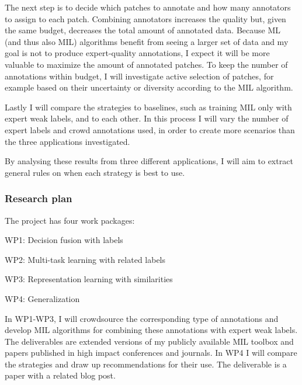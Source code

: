 \documentclass[serif, twocolumn, numeric, rga]{jote-article}
\begin{document}
The next step is to decide which patches to annotate and how many annotators to assign to each patch. Combining annotators increases the quality but, given the same budget, decreases the total amount of annotated data. Because ML (and thus also MIL) algorithms benefit from seeing a larger set of data and my goal is not to produce expert-quality annotations, I expect it will be more valuable to maximize the amount of annotated patches. To keep the number of annotations within budget, I will investigate active selection of patches, for example based on their uncertainty or diversity according to the MIL algorithm.




Lastly I will compare the strategies to baselines, such as training MIL only with expert weak labels, and to each other. In this process I will vary the number of expert labels and crowd annotations used, in order to create more scenarios than the three applications investigated.

By analysing these results from three different applications, I will aim to extract general rules on when each strategy is best to use.

\subsubsection*{Research plan}

The project has four work packages: 
\begin{description}
\item WP1: Decision fusion with labels 
\item WP2: Multi-task learning with related labels 
\item WP3: Representation learning with similarities 
\item WP4: Generalization 
\end{description}

In WP1-WP3, I will crowdsource the corresponding type of annotations and develop MIL algorithms for combining these annotations with expert weak labels. The deliverables are extended versions of my publicly available MIL toolbox \cite{Tax2016} and papers published in high impact conferences and journals. In WP4 I will compare the strategies and draw up recommendations for their use. The deliverable is a paper with a related blog post.
\end{document}
